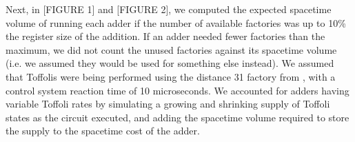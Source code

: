 \documentclass[onecolumn,unpublished]{quantumarticle}
\theoremstyle{definition}
\theoremstyle{definition}
\theoremstyle{definition}
\begin{document}
Next, in [FIGURE 1] and [FIGURE 2], we computed the expected spacetime volume of running each adder if the number of available factories was up to 10\% the register size of the addition.
If an adder needed fewer factories than the maximum, we did not count the unused factories against its spacetime volume (i.e. we assumed they would be used for something else instead).
We assumed that Toffolis were being performed using the distance 31 factory from \cite{gidney2019autoccz}, with a control system reaction time of 10 microseconds.
We accounted for adders having variable Toffoli rates by simulating a growing and shrinking supply of Toffoli states as the circuit executed, and adding the spacetime volume required to store the supply to the spacetime cost of the adder.

\begin{figure}
    \centering
    \endminipage
\end{figure}
\end{document}
